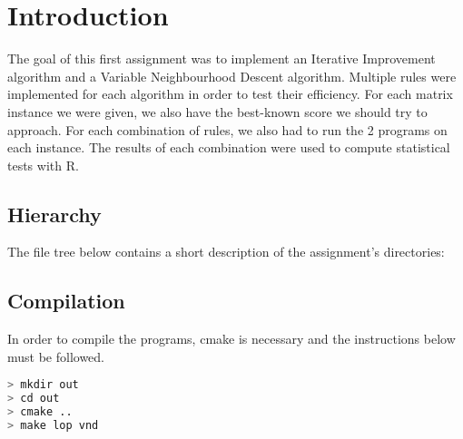 \section{Introduction}

The goal of this first assignment was to implement an Iterative Improvement
algorithm and a Variable Neighbourhood Descent algorithm. Multiple rules were
implemented for each algorithm in order to test their efficiency. For each
matrix instance we were given, we also have the best-known score we should try
to approach. For each combination of rules, we also had to run the 2 programs
on each instance. The results of each combination were used to compute
statistical tests with R.

\subsection{Hierarchy}

\noindent The file tree below contains a short description of the assignment's
directories:

\begin{framed}
\end{framed}

\subsection{Compilation}

\noindent In order to compile the programs, cmake is necessary and the
instructions below must be followed.

\begin{lstlisting}[language=bash]
> mkdir out
> cd out
> cmake ..
> make lop vnd
\end{lstlisting}

\newpage
